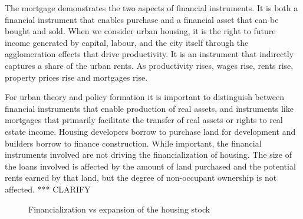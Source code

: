The mortgage demonstrates the two aspects of financial instruments. It is both a financial instrument that enables  purchase and a financial asset that can be bought and sold. When we consider urban housing, it is the right to future income generated by capital, labour, and the city itself through the agglomeration effects that drive productivity. It is an instrument that indirectly captures a share of the urban rents. As productivity rises, wages rise, rents rise, property prices rise and mortgages rise. 

For urban theory and policy formation it is important to distinguish between financial instruments that enable production of real assets, and instruments like  mortgages that primarily facilitate the transfer of real assets or rights to real estate  income. Housing developers borrow to purchase land for development and builders borrow to finance construction. While important, the financial instruments involved are not driving the financialization of housing.  The size of the loans involved is affected by the amount of land purchased and the potential rents earned by that land, but the degree of non-occupant ownership is not affected. *** CLARIFY

  \begin{figure}
\begin{center}
\end{center}
 \caption{Financialization vs expansion of the housing stock }
      \label{fig:Financialization-expansion}
  \end{figure}

